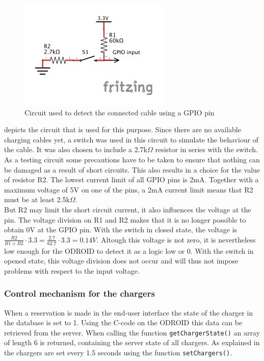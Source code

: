 \begin{figure}[!ht]
  \centering
    \includegraphics[scale=1.7]{images/cable_detection_schem.pdf}
      \caption{Circuit used to detect the connected cable using a GPIO pin \cite{fritzing}}\label{fig:cable_detect}
\end{figure}

 depicts the circuit that is used for this purpose. Since there are no available charging cables yet, a switch was used in this circuit to simulate the behaviour of the cable. It was also chosen to include a 2.7k$\Omega$ resistor in series with the switch. As a testing circuit some precautions have to be taken to ensure that nothing can be damaged as a result of short circuits. This also results in a choice for the value of resistor R2. The lowest current limit of all GPIO pins is 2mA. Together with a maximum voltage of 5V on one of the pins, a 2mA current limit means that R2 must be at least 2.5k$\Omega$.\\

But R2 may limit the short circuit current, it also influences the voltage at the pin. The voltage division on R1 and R2 makes that it is no longer possible to obtain 0V at the GPIO pin. With the switch in closed state, the voltage is $\frac{R2}{R1+R2}\cdot 3.3 = \frac{2.7}{62.7}\cdot 3.3=0.14V$. Altough this voltage is not zero, it is nevertheless low enough for the ODROID to detect it as a logic low or 0. With the switch in opened state, this voltage division does not occur and will thus not impose problems with respect to the input voltage.\\

\subsubsection{Control mechanism for the chargers}\label{sec:charger_control}
When a reservation is made in the end-user interface the state of the charger in the database is set to 1. Using the C-code on the ODROID this data can be retrieved from the server. When calling the function \verb|getChargerState()| an array of length 6 is returned, containing the server state of all chargers. As explained in  the chargers are set every 1.5 seconds using the function \verb|setChargers()|.\\ 

